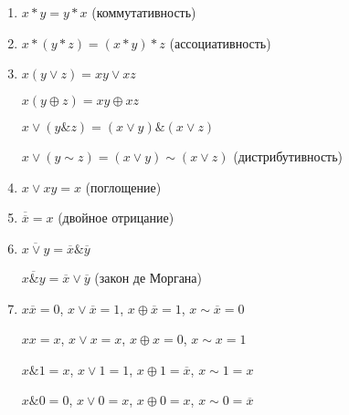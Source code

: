 \begin{enumerate}
	\item 
		$x \ast y = y \ast x$ (коммутативность)
	\item 
		$x \ast (y \ast z) = (x \ast y) \ast z$ (ассоциативность)
	\item 
		$x (y \vee z) = xy \vee xz$

		$x (y \oplus z) = xy \oplus xz$

		$x \vee (y  \&  z) = (x \vee y) \& (x \vee z)$

		$x \vee (y  \sim  z) = (x \vee y) \sim (x \vee z)$ (дистрибутивность)
	\item
		$x \vee xy = x$ (поглощение)
	\item 
		$\overline{\overline{x}} = x$ (двойное отрицание)
	\item 
		$\overline{x \vee y} = \overline{x} \& \overline{y}$

		$\overline{x \& y} = \overline{x} \vee \overline{y}$ (закон де Моргана)
	\item 
		$x\overline{x} = 0$, \smallskip $x \vee \overline{x} = 1$, \smallskip $x \oplus \overline{x} = 1$, \smallskip $x \sim \overline{x} = 0$

		$xx = x$, \smallskip $x \vee x = x$, \smallskip $x \oplus x = 0$, \smallskip $x \sim x = 1$

		$x \& 1 = x$, \smallskip $x \vee 1 = 1$, \smallskip $x \oplus 1 = \overline{x}$, \smallskip $x \sim 1 = x$

		$x \& 0 = 0$, \smallskip $x \vee 0 = x$, \smallskip $x \oplus 0 = x$, \smallskip $x \sim 0 = \overline{x}$
\end{enumerate}